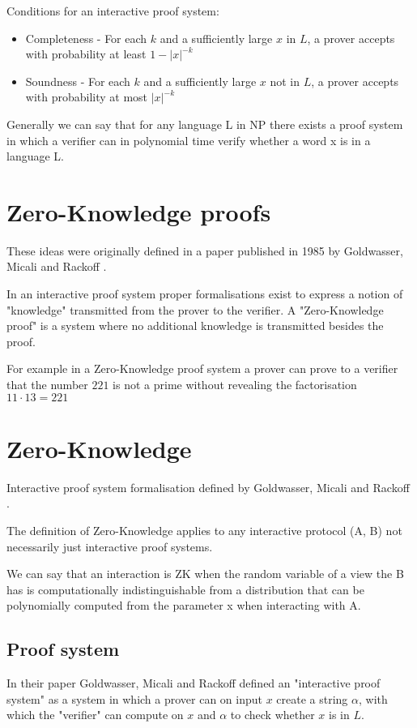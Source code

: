 \documentclass[12pt,a4paper]{article}
\begin{document}
Conditions for an interactive proof system:
\begin{itemize}
  \item Completeness - For each $k$ and a sufficiently large $x$ in $L$, a prover accepts with probability at least $1 - |x|^{-k}$ 
  \item Soundness - For each $k$ and a sufficiently large $x$ not in $L$, a prover accepts with   probability at most $|x|^{-k}$
\end{itemize}
Generally we can say that for any language L in NP there exists a proof system in which a verifier can in polynomial time verify whether a word x is in a language L.

\section{Zero-Knowledge proofs}
These ideas were originally defined in a paper published in 1985 by Goldwasser, Micali and Rackoff \cite{10.1145/22145.22178}. 

In an interactive proof system proper formalisations exist to express a notion of "knowledge" transmitted from the prover to the verifier. A "Zero-Knowledge proof" is a system where no additional knowledge is transmitted besides the proof.

For example in a Zero-Knowledge proof system a prover can prove to a verifier that the number $221$ is not a prime without revealing the factorisation $11 \cdot 13 = 221$

\section{Zero-Knowledge}
Interactive proof system formalisation defined by Goldwasser, Micali and Rackoff \cite{10.1145/22145.22178}.

The definition of Zero-Knowledge applies to any interactive protocol (A, B) not necessarily just interactive proof systems.




We can say that an interaction is ZK when the random variable of a view the B has is computationally indistinguishable from a distribution that can be polynomially computed from the parameter x when interacting with A.

 

\subsection{Proof system}
In their paper \cite{10.1145/22145.22178} Goldwasser, Micali and Rackoff defined an "interactive proof system" as a system in which a prover can on input $x$ create a string $\alpha$, with which the "verifier" can compute on $x$ and $\alpha$ to check whether $x$ is in $L$.
\end{document}
